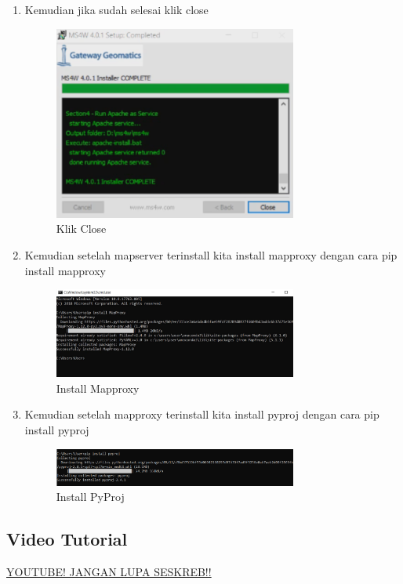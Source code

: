 \begin{enumerate}
	\item Kemudian jika sudah selesai klik close
    \hfill\break
	\begin{figure}[H]
		\includegraphics[width=8cm]{figures/1174050/1174050/5.PNG}
		\centering
		\caption{Klik Close}
	\end{figure}

    \item Kemudian setelah mapserver terinstall kita install mapproxy dengan cara pip install mapproxy
    \hfill\break
	\begin{figure}[H]
		\includegraphics[width=8cm]{figures/1174050/1174050/6.PNG}
		\centering
		\caption{Install Mapproxy}
	\end{figure}

	\item Kemudian setelah mapproxy terinstall kita install pyproj dengan cara pip install pyproj
    \hfill\break
	\begin{figure}[H]
		\includegraphics[width=8cm]{figures/1174050/1174050/7.PNG}
		\centering
		\caption{Install PyProj}
	\end{figure}
\end{enumerate}

\subsection{Video Tutorial}
\href{https://youtu.be/Smcv36QFbr8}{YOUTUBE! JANGAN LUPA SESKREB!!}
